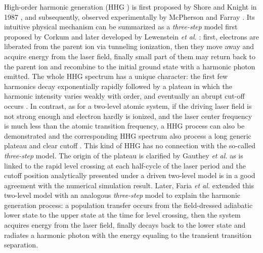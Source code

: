 \documentclass[10pt,letterpaper]{article}
\begin{document}
High-order harmonic generation (HHG ) is first proposed by Shore and Knight in 1987 \cite{Shore-HHG-Origin-JPB-1987}, and subsequently, observed experimentally by McPherson \cite{McPherson-Early-HHG-JOSAB-1987} and Farray \cite{Ferray-Early-HHG-JPB-1988}. Its intuitive physical mechanism can be summarized as a \emph{three-step} model first proposed by Corkum \cite{Corkum-PRL-1993} and later developed by Lewenstein \emph{et al.} \cite{Lewenstein-SFA-PRA-1994}: first, electrons are liberated from the parent ion via tunneling ionization, then they move away and acquire energy from the laser field, finally small part of them may return back to the parent ion and recombine to the initial ground state with a harmonic photon emitted. The whole HHG spectrum has a unique character: the first few harmonics decay exponentially rapidly followed by a plateau in which the harmonic intensity varies weakly with order, and eventually an abrupt cut-off occurs \cite{1997Review}. In contrast, as for a two-level atomic system, if the driving laser field is not strong enough and electron hardly is ionized, and the laser center frequency is much less than the atomic transition frequency, a HHG process can also be demonstrated and the corresponding HHG spectrum also process a long generic plateau and  clear cutoff \cite{Sundaram-Early-Two-Level-PRA-1990,Ivanov-Early-Two-Level-PRA-1993,Kaplan-Early-Two-Level-PRA-1994,Gauthey-Early-Two-Level-PRA-1997}. This kind of HHG has no connection with the so-called \emph{three-step} model. The origin of the plateau is clarified by Gauthey \emph{et al.} \cite{Gauthey-Early-Two-Level-PRA-1997} as is linked to the rapid level crossing at each half-cycle of the laser period and the cutoff position analytically presented under a driven two-level model is in a good agreement with the numerical simulation result. Later, Faria \emph{et al.} \cite{Faria-Two-Level-Three-Step-PRA-2002} extended this two-level model with an analogous \emph{three-step} model to explain the harmonic generation process: a population transfer occurs from the field-dressed adiabatic lower state to the upper state at the time for level crossing, then the system acquires energy from the laser field, finally decays back to the lower state and radiates a harmonic photon with the energy equaling to the transient transition separation.
\end{document}
